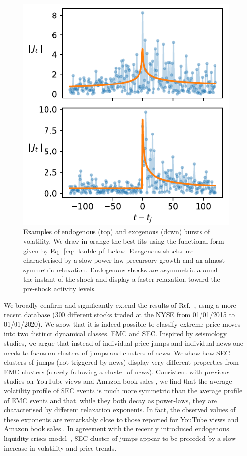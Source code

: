 \documentclass[amsmath,amssymb,aps,pre,floatfix,twocolumn,superscriptaddress]{revtex4}
\begin{document}
\begin{figure}
  \centering
  \includegraphics[width=0.9\linewidth]{sample_endo_exo.pdf}
  \caption{Examples of endogenous (top) and exogenous (down) bursts of volatility. We draw in orange the best fits using the functional form given by Eq.~\ref{eq: double pl} below. Exogenous shocks are characterised by a slow power-law precursory growth and an almost symmetric relaxation. Endogenous shocks are asymmetric around the instant of the shock and display a faster relaxation toward the pre-shock activity levels.}  
  \label{fig: sample endo exo noise}
\end{figure}

We broadly confirm and significantly extend the results of Ref.~\cite{vol_news_jp}, using a more recent database (300 different stocks traded at the NYSE from 01/01/2015 to 01/01/2020). We show that it is indeed possible to classify extreme price moves into two distinct dynamical classes, EMC and SEC. Inspired by seismology studies, we argue that instead of individual price jumps and individual news one needs to focus on clusters of jumps and clusters of news. We show how SEC clusters of jumps (not triggered by news) display very different properties from EMC clusters (closely following a cluster of news). Consistent with previous studies on YouTube views and Amazon book sales \cite{sornette_youtube, sornette_books}, we find that the average volatility profile of SEC events is much more symmetric than the average profile of EMC events and that, while they both decay as power-laws, they are characterised by different relaxation exponents.
In fact, the observed values of these exponents are remarkably close to those reported for YouTube views and Amazon book sales \cite{sornette_youtube, sornette_books}. In agreement with the recently introduced endogenous liquidity crises model~\cite{fosset2020endogenous}, SEC cluster of jumps appear to be preceded by a slow increase in volatility and price trends. 
\end{document}
